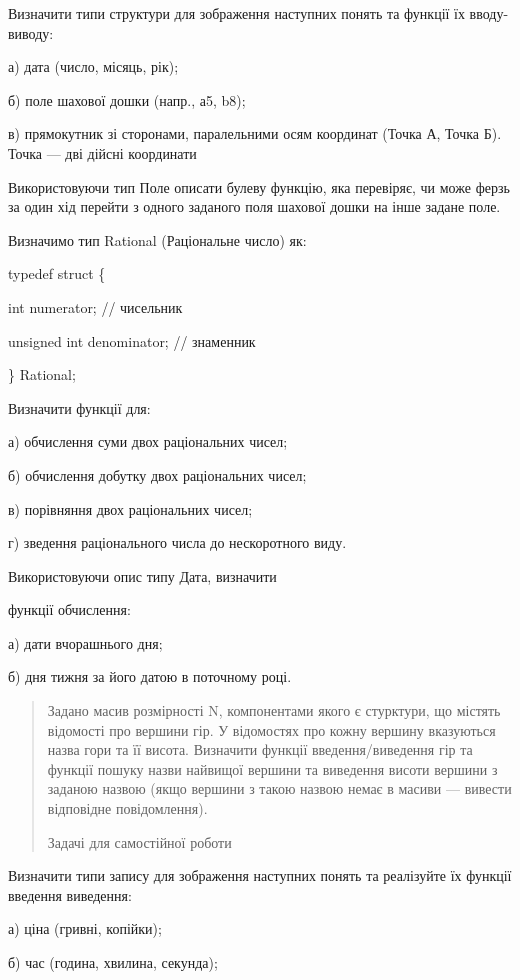\documentclass[]{article}
\begin{document}
\protect\hypertarget{_Hlk65237419}{}{} Визначити типи структури для
зображення наступних понять та функції їх вводу-виводу:

а) дата (число, місяць, рік);

б) поле шахової дошки (напр., а5, b8);

в) \protect\hypertarget{_Hlk65237388}{}{}прямокутник зі сторонами,
паралельними осям координат (Точка А, Точка Б). Точка --- дві дійсні
координати

Використовуючи тип Поле описати булеву функцію, яка перевіряє, чи може
ферзь за один хід перейти з одного заданого поля шахової дошки на інше
задане поле.

Визначимо тип Rational (Раціональне число) як:

typedef struct \{

int numerator; // чисельник

unsigned int denominator; // знаменник

\} Rational;

Визначити функції для:

а) обчислення суми двох раціональних чисел;

б) обчислення добутку двох раціональних чисел;

в) порівняння двох раціональних чисел;

г) зведення раціонального числа до нескоротного виду.

Використовуючи опис типу Дата, визначити

функції обчислення:

а) дати вчорашнього дня;

б) дня тижня за його датою в поточному році.

\begin{quote}
\protect\hypertarget{_Hlk65237504}{}{}Задано масив розмірності N,
компонентами якого є стурктури, що містять відомості про вершини гір. У
відомостях про кожну вершину вказуються назва гори та її висота.
Визначити функції введення/виведення гір та функції пошуку назви
найвищої вершини та виведення висоти вершини з заданою назвою (якщо
вершини з такою назвою немає в масиви --- вивести відповідне
повідомлення).

Задачі для самостійної роботи
\end{quote}

Визначити типи запису для зображення наступних понять та реалізуйте їх
функції введення виведення:

а) ціна (гривні, копійки);

б) час (година, хвилина, секунда);
\end{document}
